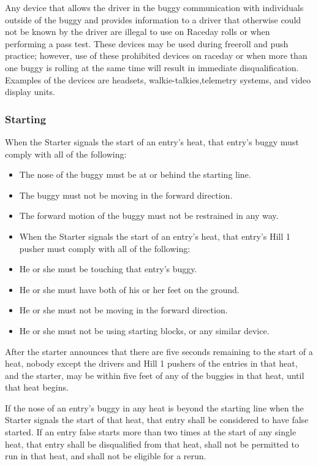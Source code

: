 \documentclass[openany]{book}
\begin{document}
Any device that allows the driver in the buggy communication with individuals outside of the buggy and provides information to a driver that otherwise could not be known by the driver are illegal to use on Raceday rolls or when performing a pass test. These devices may be used during freeroll and push practice; however, use of these prohibited devices on raceday or when more than one buggy is rolling at the same time will result in immediate disqualification. Examples of the devices are headsets, walkie-talkies,telemetry systems, and video display units.

\subsubsection{Starting}

When the Starter signals the start of an entry's heat, that entry's buggy must comply with all of the following:
\begin{itemize}
	\item The nose of the buggy must be at or behind the starting line.
	\item The buggy must not be moving in the forward direction.
	\item The forward motion of the buggy must not be restrained in any way.
	\item When the Starter signals the start of an entry's heat, that entry's Hill 1 pusher must comply with all of the following:
	\item He or she must be touching that entry's buggy.
	\item He or she must have both of his or her feet on the ground.
	\item He or she must not be moving in the forward direction.
	\item He or she must not be using starting blocks, or any similar device.
\end{itemize}

After the starter announces that there are five seconds remaining to the start of a heat, nobody except the drivers and Hill 1 pushers of the entries in that heat, and the starter, may be within five feet of any of the buggies in that heat, until that heat begins.

If the nose of an entry's buggy in any heat is beyond the starting line when the Starter signals the start of that heat, that entry shall be considered to have false started. If an entry false starts more than two times at the start of any single heat, that entry shall be disqualified from that heat, shall not be permitted to run in that heat, and shall not be eligible for a rerun.
\end{document}
